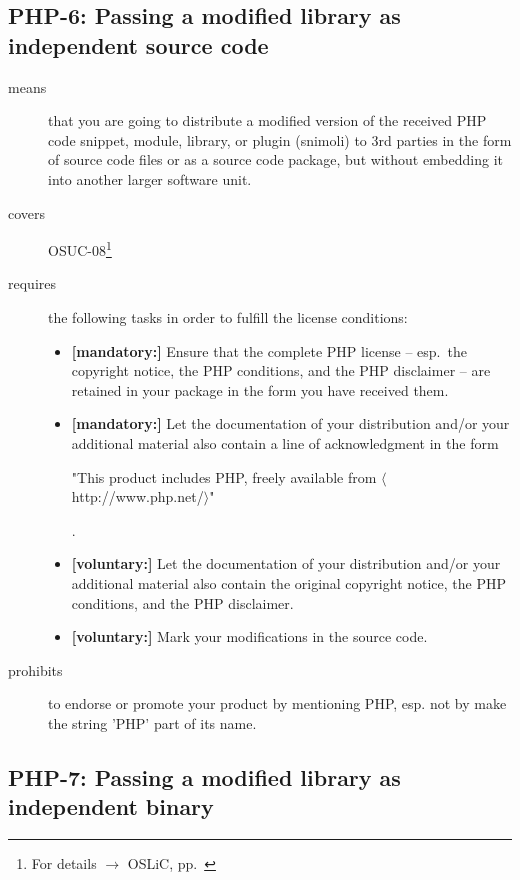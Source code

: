 \subsection{PHP-6: Passing a modified library as independent source code}
\label{OSUC-08-PHP}
\begin{description}
\item[means] that you are going to distribute a modified version of the received
PHP code snippet, module, library, or plugin (snimoli) to 3rd parties in the
form of source code files or as a source code package, but without embedding it
into another larger software unit.
\item[covers] OSUC-08\footnote{For details $\rightarrow$ OSLiC, pp.\ \pageref{OSUC-08-DEF}}
\item[requires] the following tasks in order to fulfill the license conditions:
\begin{itemize}
  
  \item \textbf{[mandatory:]} Ensure that the complete PHP license -- esp.\
  the copyright notice, the PHP conditions, and the PHP disclaimer -- are
  retained in your package in the form you have received them.
  
  \item \textbf{[mandatory:]} Let the documentation of your distribution and/or
  your additional material also contain a line of acknowledgment in the form
  \begin{footnotesize}"This product includes PHP, freely available from
  $\langle$http://www.php.net/$\rangle$"\end{footnotesize}.
    
  \item \textbf{[voluntary:]} Let the documentation of your distribution and/or
  your additional material also contain the original copyright notice, the PHP
  conditions, and the PHP disclaimer.
     
  \item \textbf{[voluntary:]} Mark your modifications in the source code.
  
\end{itemize}

\item[prohibits] to endorse or promote your product by mentioning PHP, esp. not
by make the string 'PHP' part of its name.

\end{description}


\subsection{PHP-7: Passing a modified library as independent binary}

